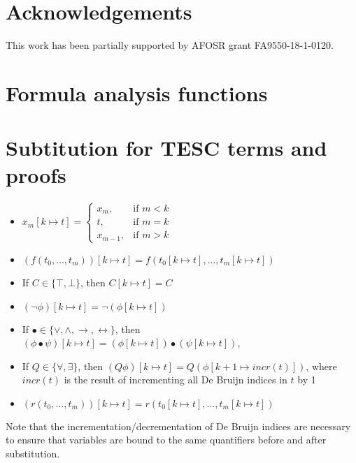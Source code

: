 \documentclass[12pt]{article}
\newcommand{\limp}[0]{\to}
\newcommand{\liff}[0]{\leftrightarrow}
\begin{document}
\section*{Acknowledgements}  \label{sec:ack}

This work has been partially supported by AFOSR grant FA9550-18-1-0120.








\appendix

\section{Formula analysis functions} \label{apdx:faf}



\section{Subtitution for TESC terms and proofs} \label{apdx:subst}

  \begin{itemize}
    \item $
      x_m [k \mapsto t] = 
      \begin{cases}
        x_m, & \text{if } m < k \\
        t, & \text{if } m = k \\
        x_{m-1}, & \text{if } m > k 
      \end{cases}
    $
    \item $(f(t_0, \ldots, t_m)) [k \mapsto t] = f(t_0[k \mapsto t], \ldots, t_m [k \mapsto t])$
    \item If $C \in \{\top, \bot\}$, then $C [k \mapsto t] = C$
    \item $(\lnot \phi) [k \mapsto t] = \lnot (\phi [k \mapsto t])$
    \item If $\bullet \in \{\lor, \land, \limp, \liff\}$, then $(\phi \bullet \psi) [k \mapsto t] = (\phi [k \mapsto t]) \bullet (\psi [k \mapsto t])$, 
    \item If $Q \in \{\forall, \exists\}$, then $(Q \phi) [k \mapsto t] = Q (\phi [k + 1 \mapsto incr(t)])$, 
      where $incr(t)$ is the result of incrementing all De Bruijn indices in $t$ by 1
    \item $(r(t_0, \ldots, t_m)) [k \mapsto t] = r(t_0[k \mapsto t], \ldots, t_m [k \mapsto t])$
  \end{itemize} 
  Note that the incrementation/decrementation of De Bruijn indices are necessary to ensure that variables are bound to the same quantifiers before and after substitution.
\end{document}
